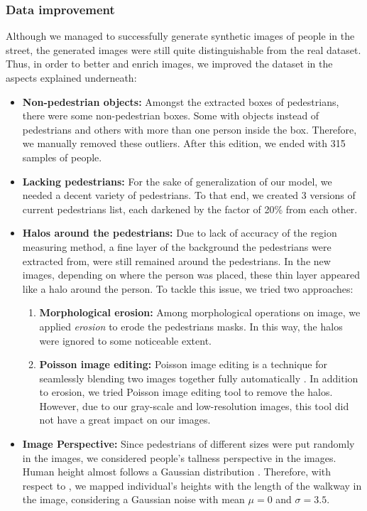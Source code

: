 \subsubsection{Data improvement}
Although we managed to successfully generate synthetic images of people in the street, the generated images were still quite distinguishable from the real dataset. Thus, in order to better and enrich images, we improved the dataset in the aspects explained underneath:
\begin{itemize}
\item \textbf{Non-pedestrian objects:} Amongst the extracted boxes of pedestrians, there were some non-pedestrian boxes. Some with objects instead of pedestrians and others with more than one person inside the box. Therefore, we manually removed these outliers. After this edition, we ended with 315 samples of people. 
\item \textbf{Lacking pedestrians:} For the sake of generalization of our model, we needed a decent variety of pedestrians. To that end, we created 3 versions of current pedestrians list, each darkened by the factor of 20\% from each other. 
\item \textbf{Halos around the pedestrians:} Due to lack of accuracy of the region measuring method, a fine layer of the background the pedestrians were extracted from, were still remained around the pedestrians. In the new images, depending on where the person was placed, these thin layer appeared like a halo around the person. To tackle this issue, we tried two approaches:
\begin{enumerate}
\item \textbf{Morphological erosion:} Among morphological operations on image, we applied \textit{erosion} \cite{van2014scikit} to erode the pedestrians masks. In this way, the halos were ignored to some noticeable extent. 
\item \textbf{Poisson image editing:} Poisson image editing is a technique for seamlessly blending two images together fully automatically  \cite{perez2003poisson}. In addition to erosion, we tried Poisson image editing tool to remove the halos. However, due to our gray-scale and low-resolution images, this tool did not have a great impact on our images.      
\end{enumerate}
\item \textbf{Image Perspective:} Since pedestrians of different sizes were put randomly in the images, we considered people's tallness perspective in the images. Human height almost follows a Gaussian distribution \cite{subramanian2011height}. Therefore, with respect to \cite{subramanian2011height, garcia2007evolution}, we mapped individual's heights with the length of the walkway in the image, considering a Gaussian noise with mean $\mu = 0$ and $\sigma = 3.5$.  
\end{itemize}

